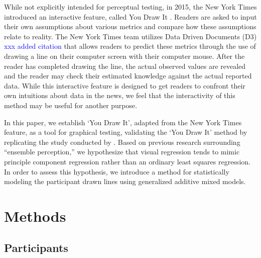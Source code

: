 \documentclass[12pt]{article}
\begin{document}
While not explicitly intended for perceptual testing, in 2015, the New
York Times introduced an interactive feature, called You Draw It
\citep{aisch_cox_quealy_2015, buchanan_park_pearce_2017, katz_2017}.
Readers are asked to input their own assumptions about various metrics
and compare how these assumptions relate to reality. The New York Times
team utilizes Data Driven Documents (D3) \citep{bostock2011d3}
{\textcolor{blue}{xxx added citation}} that allows readers to predict
these metrics through the use of drawing a line on their computer screen
with their computer mouse. After the reader has completed drawing the
line, the actual observed values are revealed and the reader may check
their estimated knowledge against the actual reported data. While this
interactive feature is designed to get readers to confront their own
intuitions about data in the news, we feel that the interactivity of
this method may be useful for another purpose.

In this paper, we establish `You Draw It', adapted from the New York
Times feature, as a tool for graphical testing, validating the `You Draw
It' method by replicating the study conducted by
\citet{mosteller1981eye}. Based on previous research surrounding
``ensemble perception,'' we hypothesize that visual regression tends to
mimic principle component regression rather than an ordinary least
squares regression. In order to assess this hypothesis, we introduce a
method for statistically modeling the participant drawn lines using
generalized additive mixed models.

\hypertarget{methods}{%
\section{Methods}\label{methods}}

\hypertarget{participants}{%
\subsection{Participants}\label{participants}}
\end{document}
